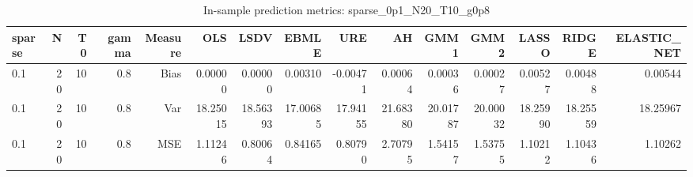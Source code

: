 \begin{table}[!htbp]\centering
\caption{In-sample prediction metrics: sparse_0p1_N20_T10_g0p8}
\label{tab:table2_sparse_0p1_N20_T10_g0p8}
\begin{tabular}{lrrrrrrrrrrrrrr}
\hline
sparse & N & T0 & gamma & Measure & OLS & LSDV & EBMLE & URE & AH & GMM1 & GMM2 & LASSO & RIDGE & ELASTIC_NET \\
\hline
0.1 & 20 & 10 & 0.8 & Bias & 0.00000 & 0.00000 & 0.00310 & -0.00471 & 0.00064 & 0.00036 & 0.00027 & 0.00527 & 0.00488 & 0.00544 \\
0.1 & 20 & 10 & 0.8 & Var & 18.25015 & 18.56393 & 17.00685 & 17.94155 & 21.68380 & 20.01787 & 20.00032 & 18.25990 & 18.25559 & 18.25967 \\
0.1 & 20 & 10 & 0.8 & MSE & 1.11246 & 0.80064 & 0.84165 & 0.80790 & 2.70795 & 1.54157 & 1.53755 & 1.10212 & 1.10436 & 1.10262 \\
\hline
\end{tabular}
\end{table}

